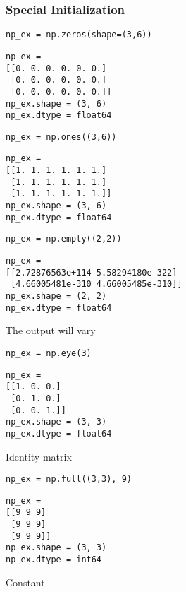 \subsubsection{Special Initialization}

\begin{lstlisting}[style=pyInStyle]
np_ex = np.zeros(shape=(3,6))
\end{lstlisting}
\begin{lstlisting}[style=pyOutStyle]
np_ex = 
[[0. 0. 0. 0. 0. 0.]
 [0. 0. 0. 0. 0. 0.]
 [0. 0. 0. 0. 0. 0.]]
np_ex.shape = (3, 6)
np_ex.dtype = float64
\end{lstlisting}


\begin{lstlisting}[style=pyInStyle]
np_ex = np.ones((3,6))
\end{lstlisting}
\begin{lstlisting}[style=pyOutStyle]
np_ex = 
[[1. 1. 1. 1. 1. 1.]
 [1. 1. 1. 1. 1. 1.]
 [1. 1. 1. 1. 1. 1.]]
np_ex.shape = (3, 6)
np_ex.dtype = float64
\end{lstlisting}


\begin{lstlisting}[style=pyInStyle]
np_ex = np.empty((2,2))
\end{lstlisting}
\begin{lstlisting}[style=pyOutStyle]
np_ex = 
[[2.72876563e+114 5.58294180e-322]
 [4.66005481e-310 4.66005485e-310]]
np_ex.shape = (2, 2)
np_ex.dtype = float64
\end{lstlisting}
\begin{markdown}
The output will vary
\end{markdown}


\begin{lstlisting}[style=pyInStyle]
np_ex = np.eye(3)
\end{lstlisting}
\begin{lstlisting}[style=pyOutStyle]
np_ex = 
[[1. 0. 0.]
 [0. 1. 0.]
 [0. 0. 1.]]
np_ex.shape = (3, 3)
np_ex.dtype = float64
\end{lstlisting}
\begin{markdown}
Identity matrix
\end{markdown}


\begin{lstlisting}[style=pyInStyle]
np_ex = np.full((3,3), 9)
\end{lstlisting}
\begin{lstlisting}[style=pyOutStyle]
np_ex = 
[[9 9 9]
 [9 9 9]
 [9 9 9]]
np_ex.shape = (3, 3)
np_ex.dtype = int64
\end{lstlisting}
\begin{markdown}
Constant
\end{markdown}


